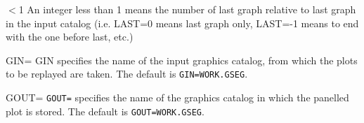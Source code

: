 \begin{proglist}
\begin{proglist}
\item[$<$1]
An integer less than 1 means the number of last graph relative to last
graph in the input catalog (i.e. LAST=0 means 
last graph only, LAST=-1 means to end with the one before last, etc.) 

\end{proglist}

\item[GIN=]
GIN specifies the name of the input graphics catalog, from which the
plots to be replayed are taken. The default is \texttt{GIN=WORK.GSEG}.

\item[GOUT=]
\texttt{GOUT=} specifies the name of the graphics catalog in which the panelled
plot is stored. The default is \texttt{GOUT=WORK.GSEG}.

\end{proglist}

